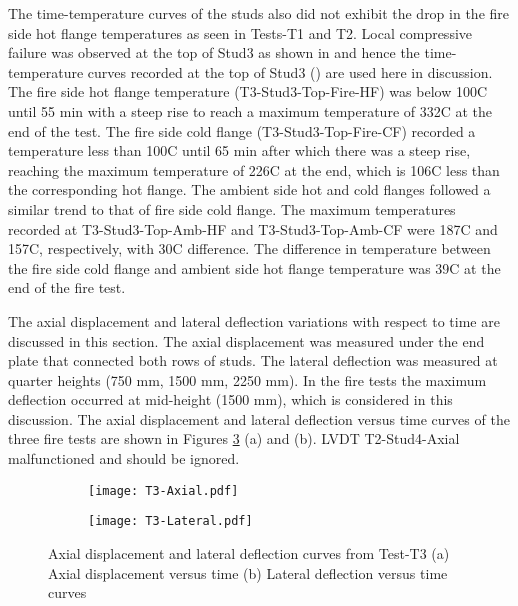 The time-temperature curves of the studs also did not exhibit the drop in the fire side hot flange temperatures as seen in Tests-T1 and T2. Local compressive failure was observed at the top of Stud3 as shown in  and hence the time-temperature curves recorded at the top of Stud3 () are used here in discussion. The fire side hot flange temperature (T3-Stud3-Top-Fire-HF) was below 100\degree C until 55 min with a steep rise to reach a maximum temperature of 332\degree C at the end of the test. The fire side cold flange (T3-Stud3-Top-Fire-CF) recorded a temperature less than 100\degree C until 65 min after which there was a steep rise, reaching the maximum temperature of 226\degree C at the end, which is 106\degree C less than the corresponding hot flange. The ambient side hot and cold flanges followed a similar trend to that of fire side cold flange. The maximum temperatures recorded at T3-Stud3-Top-Amb-HF and T3-Stud3-Top-Amb-CF were 187\degree C and 157\degree C, respectively, with 30\degree C difference. The difference in temperature between the fire side cold flange and ambient side hot flange temperature was 39\degree C at the end of the fire test.

The axial displacement and lateral deflection variations with respect to time are discussed in this section. The axial displacement was measured under the end plate that connected both rows of studs. The lateral deflection was measured at quarter heights (750 mm, 1500 mm, 2250 mm). In the fire tests the maximum deflection occurred at mid-height (1500 mm), which is considered in this discussion. The axial displacement and lateral deflection versus time curves of the three fire tests are shown in Figures \ref{fig:T3-Axial-Lateral} (a) and (b). LVDT T2-Stud4-Axial malfunctioned and should be ignored.
\begin{figure}[!htbp]
	\centering
	\begin{subfigure}[b]{0.7\textwidth}
		\centering
		\texttt{[image: T3-Axial.pdf]}
		\caption{}
		\label{subfig:T3-Axial}
	\end{subfigure}
	\begin{subfigure}[b]{0.7\textwidth}
		\centering
		\texttt{[image: T3-Lateral.pdf]}
		\caption{}
		\label{subfig:T3-Lateral}
	\end{subfigure}
	   \caption{Axial displacement and lateral deflection curves from Test-T3 (a) Axial displacement versus time (b) Lateral deflection versus time curves}
	   \label{fig:T3-Axial-Lateral}
\end{figure}

